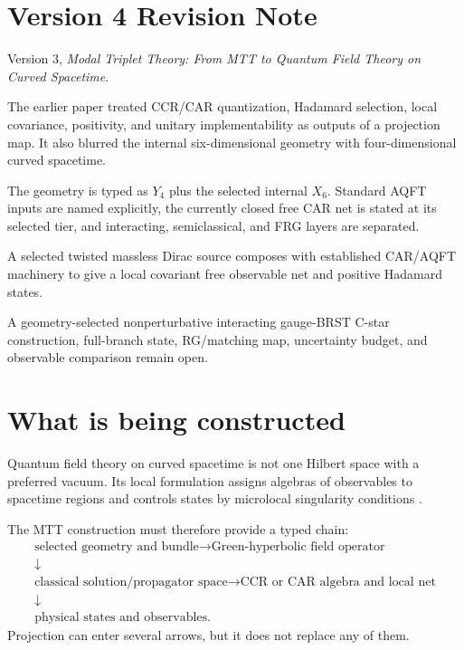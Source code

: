 \documentclass[11pt]{article}
\theoremstyle{definition}
\theoremstyle{remark}
\begin{document}
\section*{Version 4 Revision Note}
\begin{description}[leftmargin=3.2cm,style=nextline]
\item[Supersedes] Version 3, \emph{Modal Triplet Theory: From MTT to Quantum
Field Theory on Curved Spacetime}.
\item[Reason] The earlier paper treated CCR/CAR quantization, Hadamard
selection, local covariance, positivity, and unitary implementability as
outputs of a projection map. It also blurred the internal six-dimensional
geometry with four-dimensional curved spacetime.
\item[Resolution] The geometry is typed as \(Y_4\) plus the selected
internal \(X_6\). Standard AQFT inputs are named explicitly, the currently
closed free CAR net is stated at its selected tier, and interacting,
semiclassical, and FRG layers are separated.
\item[Retained result] A selected twisted massless Dirac source composes
with established CAR/AQFT machinery to give a local covariant free
observable net and positive Hadamard states.
\item[Remaining boundary] A geometry-selected nonperturbative interacting
gauge-BRST C-star construction, full-branch state, RG/matching map,
uncertainty budget, and observable comparison remain open.
\end{description}

\tableofcontents

\section{What is being constructed}

Quantum field theory on curved spacetime is not one Hilbert space with a
preferred vacuum. Its local formulation assigns algebras of observables to
spacetime regions and controls states by microlocal singularity conditions
\cite{Wald,Radzikowski,BFV}.

The MTT construction must therefore provide a typed chain:
\[
\begin{gathered}
\text{selected geometry and bundle}
\longrightarrow
\text{Green-hyperbolic field operator}\\
\downarrow\\
\text{classical solution/propagator space}
\longrightarrow
\text{CCR or CAR algebra and local net}\\
\downarrow\\
\text{physical states and observables}.
\end{gathered}
\]
Projection can enter several arrows, but it does not replace any of them.
\end{document}
